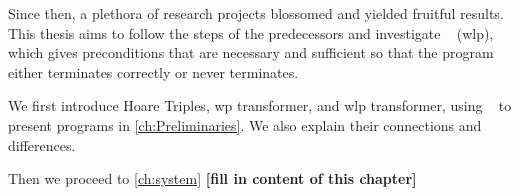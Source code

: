 Since then, a plethora of research projects blossomed and yielded fruitful results. 
This thesis aims to follow the steps of the predecessors and investigate ~\cite{dijkstra90} (wlp), which gives preconditions that are necessary and sufficient so that the program either terminates correctly or never terminates. 

We first introduce Hoare Triples, wp transformer, and wlp transformer, using ~\cite{dijkstra75} to present programs in \autoref{ch:Preliminaries}. 
We also explain their connections and differences. 

Then we proceed to \autoref{ch:system} \textbf{[fill in content of this chapter]} %









